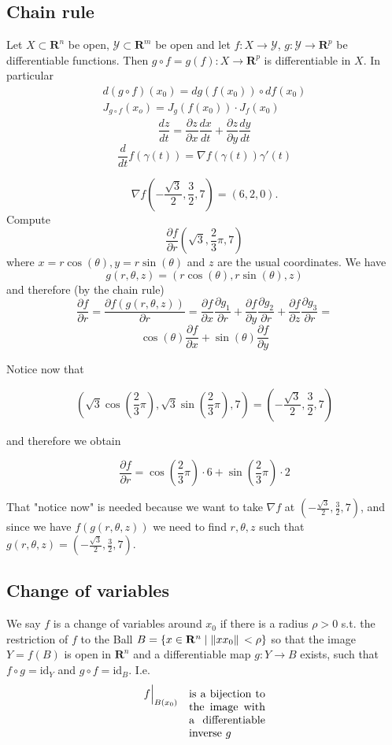 \documentclass[8pt]{extarticle}
\newcommand{\R}{{\mathbb R}}
\newcommand{\X}{{\mathcal X}}
\newcommand{\ra}{{\rightarrow}}
\def\R{\mathbf{R}}
\def\X{X}
\def\BoxStart{\begin{tcolorbox}[colback=blue!5!white,colframe=blue!75!black]}
\def\BoxEnd{\end{tcolorbox}}
\begin{document}
\begin{multicols*}{3}
  \subsection{Chain rule}
  Let $\X \subset \R^n$ be open,
  $\mathcal{Y} \subset \R^m$ be open and
  let $f: \X \ra \mathcal{Y}$, $g: \mathcal{Y} \ra \R^p$
  be differentiable functions. Then $g \circ f = g(f): \X \ra \R^p$
  is differentiable in $\X$. In particular
  \begin{align*}
    d(g \circ f)(x_0) = dg(f(x_0)) \circ df(x_0) \\
    J_{g \circ f}(x_o) = J_g(f(x_0)) \cdot J_f(x_0)
  \end{align*}
$$\frac{dz}{dt} = \frac{\partial{z}}{\partial{x}} \frac{dx}{dt} + \frac{\partial{z}}{\partial{y}} \frac{dy}{dt}$$
$$\frac{d}{dt} f(\gamma(t)) = \nabla f (\gamma(t)) \gamma'(t)$$
\BoxStart
$$ \nabla f (-\frac{\sqrt{3}}{2}, \frac{3}{2}, 7) = (6, 2, 0).$$ Compute
$$\frac{\partial{f}}{\partial{r}}(\sqrt{3}, \frac{2}{3}\pi, 7)$$
where $x = r\cos(\theta), y = r\sin(\theta)$ and $z$ are the usual coordinates.
We have
$$g(r,\theta,z) = (r \cos(\theta), r \sin(\theta), z)$$
and therefore (by the chain rule)
$$\frac{\partial f}{\partial r} = \frac{\partial f(g(r,\theta,z))}{\partial r} = \frac{\partial f}{\partial x} \frac{\partial g_1}{\partial r} + \frac{\partial f}{\partial y} \frac{\partial g_2}{\partial r} + \frac{\partial f}{\partial z} \frac{\partial g_3}{\partial r} = $$ 
$$\cos(\theta) \frac{\partial f}{\partial x} + \sin(\theta) \frac{\partial f}{\partial y}$$

Notice now that

$$(\sqrt{3} \cos(\frac {2}{3} \pi), \sqrt{3} \sin(\frac{2}{3} \pi), 7) = (-\frac{\sqrt{3}}{2}, \frac{3}{2}, 7)$$

and therefore we obtain

$$\frac{\partial f}{\partial r} = \cos(\frac {2}{3} \pi) \cdot 6 + \sin(\frac{2}{3} \pi) \cdot 2$$

That "notice now" is needed because we want to take $\nabla f$ at $(-\frac{\sqrt{3}}{2}, \frac{3}{2}, 7)$, and since we have $f(g(r,\theta,z))$ we need to find $r,\theta,z$ such that $g(r,\theta,z) = (-\frac{\sqrt{3}}{2}, \frac{3}{2}, 7)$.
\BoxEnd
  \subsection{Change of variables}
  We say $f$ is a change of variables around
  $x_0$ if there is a radius $\rho > 0$ s.t. the restriction
  of $f$ to the Ball $B = \{x \in \R^n\;|\; \norm*{x  x_0} < \rho\}$
  so that the image $Y = f(B)$ is open in $\R^n$ and a differentiable
  map $g: Y \ra B$ exists, such that
  $f \circ g = \text{id}_Y$ and $g \circ f = \text{id}_B$.
  I.e.
  \begin{align*}
    f \Big |_{B(x_0)}
    \quad \parbox[t]{0.2\textwidth}{
      is a bijection to the image with
    a differentiable inverse $g$} 
  \end{align*}


\end{multicols*}
\end{document}
